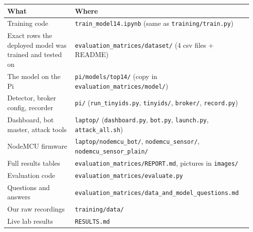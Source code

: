 \documentclass[11pt,a4paper]{article}
\newcommand{\file}[1]{\texttt{\small #1}}
\newcommand{\tablestart}{\Needspace{8\baselineskip}}
\begin{document}
\tablestart
\begin{center}
\begin{tabularx}{\linewidth}{P{4.8cm}L}
\toprule
What & Where \\
\midrule
Training code & \file{train\_model14.ipynb} (same as \file{training/train.py}) \\
Exact rows the deployed model was trained and tested on & \file{evaluation\_matrices/dataset/} (4 csv files + README) \\
The model on the Pi & \file{pi/models/top14/} (copy in \file{evaluation\_matrices/model/}) \\
Detector, broker config, recorder & \file{pi/} (\file{run\_tinyids.py}, \file{tinyids/}, \file{broker/}, \file{record.py}) \\
Dashboard, bot master, attack tools & \file{laptop/} (\file{dashboard.py}, \file{bot.py}, \file{launch.py}, \file{attack\_all.sh}) \\
NodeMCU firmware & \file{laptop/nodemcu\_bot/}, \file{nodemcu\_sensor/}, \file{nodemcu\_sensor\_plain/} \\
Full results tables & \file{evaluation\_matrices/REPORT.md}, pictures in \file{images/} \\
Evaluation code & \file{evaluation\_matrices/evaluate.py} \\
Questions and answers & \file{evaluation\_matrices/data\_and\_model\_questions.md} \\
Our raw recordings & \file{training/data/} \\
Live lab results & \file{RESULTS.md} \\
\bottomrule
\end{tabularx}
\end{center}
\end{document}
